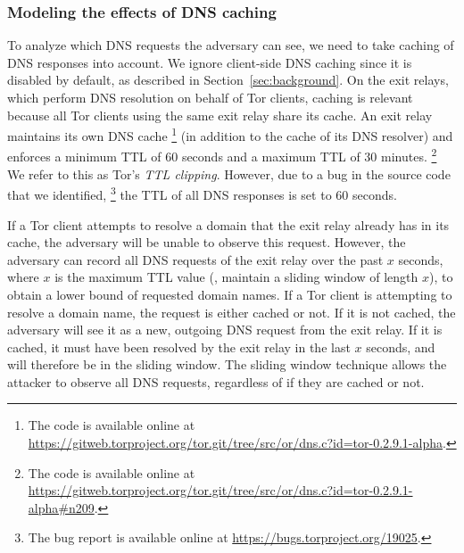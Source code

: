 \subsubsection{Modeling the effects of DNS caching}
To analyze which DNS requests the adversary can see, we need to
take caching of DNS responses into account. We ignore client-side DNS
caching since it is disabled by default, as described in
Section~\ref{sec:background}.
On the exit relays, which perform DNS resolution on behalf of Tor clients,
caching is relevant because all Tor clients using the same exit relay share its
cache.  An exit relay maintains its own DNS cache%
\footnote{The code is available online at \url{https://gitweb.torproject.org/tor.git/tree/src/or/dns.c?id=tor-0.2.9.1-alpha}.}
(in addition to the cache of its DNS resolver) and enforces a minimum TTL of 60
seconds and a maximum TTL of 30 minutes.%
\footnote{The code is available online at \url{https://gitweb.torproject.org/tor.git/tree/src/or/dns.c?id=tor-0.2.9.1-alpha\#n209}.}
We refer to this as Tor's \emph{TTL clipping}. However, due to a bug in the
source code that we identified,%
\footnote{The bug report is available online at \url{https://bugs.torproject.org/19025}.}
the TTL of all DNS responses is set to 60 seconds.

If a Tor client attempts to resolve a domain that the exit relay already has in
its cache, the adversary will be unable to observe this request.  However, the
adversary can record all DNS requests of the exit relay over the past $x$
seconds, where $x$ is the maximum TTL value (\ie, maintain a sliding window of
length $x$), to obtain a lower bound of requested domain names.  If a Tor client
is attempting to resolve a domain name, the request is either cached or not.  If
it is not cached, the adversary will see it as a new, outgoing DNS request from
the exit relay. If it is cached, it must have been resolved by the exit relay in
the last $x$ seconds, and will therefore be in the sliding window.  The sliding
window technique allows the attacker to observe all DNS requests, regardless of
if they are cached or not.

